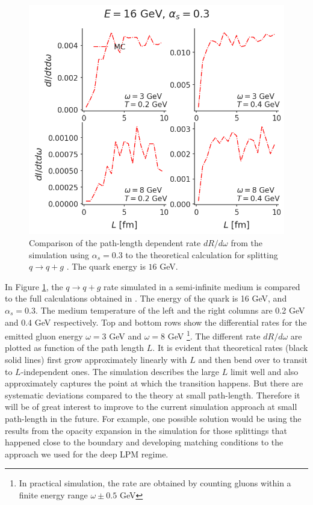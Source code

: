 \documentclass[aps, prc, reprint, amsmath, groupedaddress, nofootinbib]{revtex4-1}
\begin{document}
\begin{figure}
\includegraphics[width=\columnwidth]{spectrum_L.png}
\caption{Comparison of the path-length dependent rate $dR/d\omega$ from the simulation using $\alpha_s = 0.3$ to the theoretical calculation for splitting $q\rightarrow q+g$ \cite{CaronHuot:2010bp}. The quark energy is $16$ GeV.}
\label{fig:spectra-L-alphas=0.3}
\end{figure}

In Figure \ref{fig:spectra-L-alphas=0.3}, the $q\rightarrow q+g$ rate simulated in a semi-infinite medium is compared to the full calculations obtained in \cite{CaronHuot:2010bp}.
The energy of the quark is 16 GeV, and $\alpha_s = 0.3$.
The medium temperature of the left and the right columns are 0.2 GeV and 0.4 GeV respectively.
Top and bottom rows show the differential rates for the emitted gluon  energy $\omega = 3$ GeV and $\omega = 8$ GeV \footnote{In practical simulation, the rate are obtained by counting gluons within a finite energy range $\omega\pm 0.5$ GeV}.
The different rate $dR/d\omega$ are plotted as function of the path length $L$.
It is evident that theoretical rates (black solid lines) first grow approximately linearly with $L$ and then bend over to transit to $L$-independent ones.
The simulation describes the large $L$ limit well and also approximately captures the point at which the transition happens.
But there are systematic deviations compared to the theory at small path-length.
Therefore it will be of great interest to improve to the current simulation approach at small path-length in the future. 
For example, one possible solution would be using the results from the opacity expansion in the simulation for those splittings that happened close to the boundary and developing matching conditions to the approach we used for the deep LPM regime.
\end{document}
